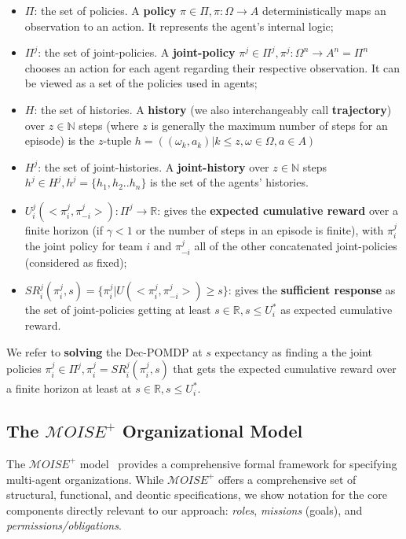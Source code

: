 \documentclass[pdflatex,sn-mathphys-num]{sn-jnl}%
\theoremstyle{thmstyleone}%
\theoremstyle{thmstyletwo}%
\theoremstyle{thmstylethree}%
\begin{document}
\begin{itemize}

    \item $\Pi$: the set of policies. A \textbf{policy} $\pi \in \Pi, \pi: \Omega \rightarrow A$ deterministically maps an observation to an action. It represents the agent's internal logic;
    \item $\Pi^{j}$: the set of joint-policies. A \textbf{joint-policy} $\pi^{j} \in \Pi^{j}, \pi^{j}: \Omega^n \rightarrow A^n = \Pi^n$ chooses an action for each agent regarding their respective observation. It can be viewed as a set of the policies used in agents;
    \item $H$: the set of histories. A \textbf{history} (we also interchangeably call \textbf{trajectory}) over $z \in \mathbb{N}$ steps (where $z$ is generally the maximum number of steps for an episode) is the $z$-tuple $h = ((\omega_{k}, a_{k}) | k \leq z, \omega \in \Omega, a \in A)$
    \item $H^{j}$: the set of joint-histories. A \textbf{joint-history} over $z \in \mathbb{N}$ steps $h^{j} \in H^{j}, h^{j} = \{h_1,h_2..h_n\}$ is the set of the agents' histories.
    \item $U^{j}_{i}(<\pi^{j}_{i}, \pi^{j}_{-i}>): \Pi^{j} \rightarrow \mathbb{R}$: gives the \textbf{expected cumulative reward} over a finite horizon (if $\gamma < 1$ or the number of steps in an episode is finite), with $\pi^{j}_{i}$ the joint policy for team $i$ and $\pi^{j}_{-i}$ all of the other concatenated joint-policies (considered as fixed);
    \item $SR^{j}_{i}(\pi^{j}_{i}, s) = \{\pi^{j}_{i} | U(<\pi^{j}_{i},\pi^{j}_{-i}>) \geq s\}$: gives the \textbf{sufficient response} as the set of joint-policies getting at least $s \in \mathbb{R}, s \leq U_i^*$ as expected cumulative reward.
\end{itemize}

\noindent We refer to \textbf{solving} the Dec-POMDP at $s$ expectancy as finding a the joint policies $\pi^{j}_{i} \in \Pi^{j}, \pi^{j}_{i} = SR^{j}_{i}(\pi^{j}_{i}, s)$ that gets the expected cumulative reward over a finite horizon at least at $s \in \mathbb{R}, s \leq U_i^*$.


\subsection{The $\mathcal{M}OISE^+$ Organizational Model}

The $\mathcal{M}OISE^+$ model~\cite{Hubner2002, Hubner2007} provides a comprehensive formal framework for specifying multi-agent organizations. While $\mathcal{M}OISE^+$ offers a comprehensive set of structural, functional, and deontic specifications, we show notation for the core components directly relevant to our approach: \textit{roles}, \textit{missions} (goals), and \textit{permissions/obligations}.
\end{document}
